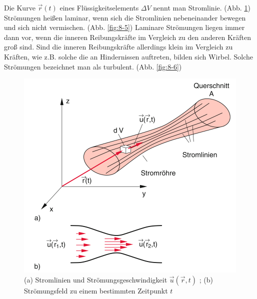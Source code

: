 Die Kurve $ \vec{r} (t) $ eines Flüssigkeitselements $ \Delta V $ nennt man Stromlinie. (Abb. \ref{fig:8-1}) Strömungen heißen laminar, wenn sich die Stromlinien nebeneinander bewegen und sich nicht vermischen. (Abb. \ref{fig:8-5}) Laminare Strömungen liegen immer dann vor, wenn die inneren Reibungskräfte im Vergleich zu den anderen Kräften groß sind. Sind die inneren Reibungskräfte allerdings klein im Vergleich zu Kräften, wie z.B. solche die an Hindernissen auftreten, bilden sich Wirbel. Solche Strömungen bezeichnet man als turbulent. (Abb. \ref{fig:8-6})

\begin{figure}
        \includegraphics[width=.9\textwidth]{images/8-1}
\caption{(a) Stromlinien und Strömungsgeschwindigkeit $ \vec{u}(\vec{r},t) $ ; (b) Strömungsfeld zu einem bestimmten Zeitpunkt $t$ }
\label{fig:8-1}
\end{figure}

